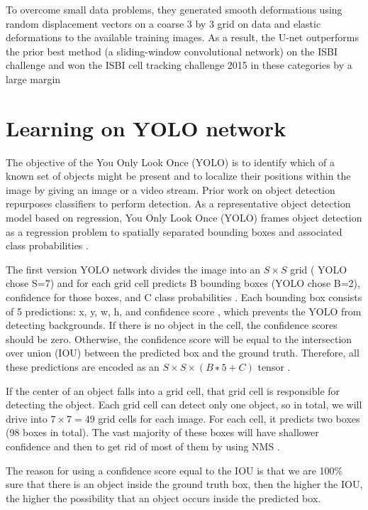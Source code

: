 To overcome small data problems, they generated smooth deformations using random displacement vectors on a coarse 3 by 3 grid on data and elastic deformations to the available training images\cite{unet}. As a result, the U-net outperforms the prior best method (a sliding-window convolutional network) on the ISBI challenge and  won the ISBI cell tracking challenge 2015 in these categories by a large margin \cite{unet}


\section{Learning on YOLO network}

The objective of the You Only Look Once (YOLO)\cite{yolov1} is to identify which of a known set of objects might be present and to localize their positions within the image by giving an image or a video stream. Prior work on object detection repurposes classifiers to perform detection. As a representative object detection model based on regression, You Only Look Once (YOLO) frames object detection as a regression problem to spatially separated bounding boxes and associated class probabilities \cite{yolov1}.

The first version YOLO network\cite{yolov1} divides the image into an $S \times S$ grid ( YOLO chose S=7) and for each grid cell predicts B bounding boxes (YOLO chose B=2), confidence for those boxes, and C class probabilities \cite{yolov1}. Each bounding box consists of 5 predictions: x, y, w, h, and confidence score \cite{yolov1}, which prevents the YOLO from detecting backgrounds.  If there is no object in the cell, the conﬁdence scores should be zero.  Otherwise, the conﬁdence score will be equal to the intersection over union (IOU) between the predicted box and the ground truth. Therefore,  all these predictions are encoded as an $S × S × (B ∗ 5 + C)$ tensor \cite{yolov1}.

If the center of an object falls into a grid cell, that grid cell is responsible for detecting the object. Each grid cell can detect only one object, so in total, we will drive into $7\times 7=49$ grid cells for each image. For each cell, it predicts two boxes (98 boxes in total). The vast majority of these boxes will have shallower confidence and then to get rid of most of them by using NMS \cite{yolov1}.

The reason for using a confidence score equal to the IOU is that we are 100\% sure that there is an object inside the ground truth box, then the higher the IOU, the higher the possibility that an object occurs inside the predicted box.



